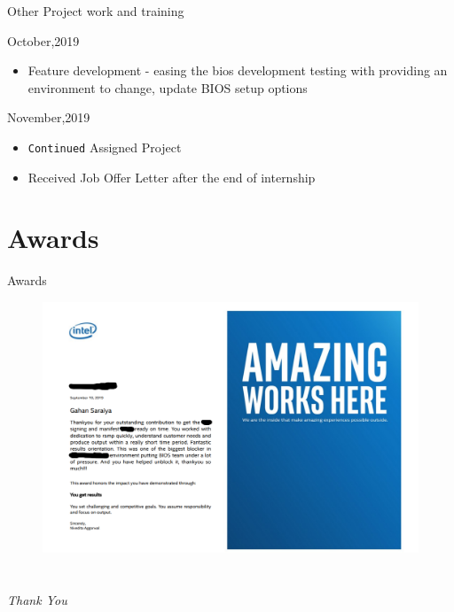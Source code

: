 \documentclass{beamer}
\begin{document}
\begin{frame}[allowframebreaks]{Other Project work and training}
    \begin{redblock}{October,2019}
        \begin{itemize}
            \item Feature development - easing the bios development testing with providing an environment to change, update BIOS setup options
        \end{itemize}
    \end{redblock}

    \begin{greenblock}{November,2019}
        \begin{itemize}
            \item \verb|Continued| Assigned Project
            \item Received Job Offer Letter after the end of internship
        \end{itemize}
    \end{greenblock}


\end{frame}

\section{Awards}
\begin{frame}{Awards}
\begin{figure}[htbp]
    \centering
    \includegraphics[width=\linewidth]{Im/figures/award1}
\end{figure}
\end{frame}





%
\section*{}
\begin{frame}{}
	\centering \Huge
	\emph{Thank You}
\end{frame}
\end{document}
